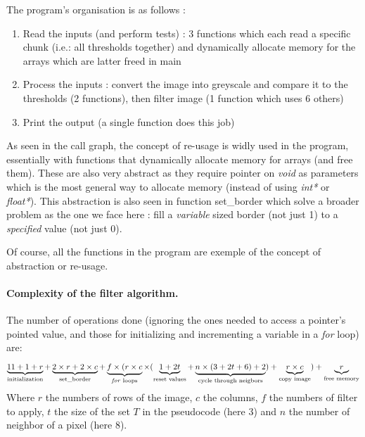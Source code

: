 \documentclass[a4paper]{report} %
\begin{document}
\SetEndCharOfAlgoLine{}

The program's organisation is as follows :
\begin{enumerate}
\item Read the inputs (and perform tests) : 3 functions which each read a specific chunk (i.e.: all thresholds together) and dynamically allocate memory for the arrays which are latter freed in main

\item Process the inputs : convert the image into greyscale and compare it to the thresholds (2 functions), then filter image (1 function which uses 6 others)

\item Print the output (a single function does this job)
\end{enumerate}

As seen in the call graph, the concept of re-usage is widly used in the program, essentially with functions that dynamically allocate memory for arrays (and free them).
These are also very abstract as they require pointer on \emph{void} as parameters which is the most general way to allocate memory (instead of using \emph{int*} or \emph{float*}).
This abstraction is also seen in function set\_border which solve a broader problem as the one we face here : fill a \emph{variable} sized border (not just 1) to a \emph{specified} value (not just 0).

Of course, all the functions in the program are exemple of the concept of abstraction or re-usage.

\paragraph{Complexity of the filter algorithm.} The number of operations done (ignoring the ones needed to access a pointer's pointed value, and those for initializing and incrementing a variable in a \emph{for} loop) are:
\[
\underbrace{11 + 1 + r }_{\text{initialization}}
+
\underbrace{2 \times r + 2 \times c }_{\text{set\_border}} 
+
\underbrace{ f \times ( r \times c }_{\text{\emph{for} loops}}
\times ( 
\underbrace{1+2t}_{\text{reset values}}
+ 
\underbrace{n \times (3 + 2t + 6) + 2}_{\text{cycle through neigbors}}
) + 
\underbrace{ r \times c }_{\text{copy image}}
)+ 
\underbrace{ r }_{\text{free memory}}
\]
Where $r$ the numbers of rows of the image, $c$ the columns, $f$ the numbers of filter to apply, $t$ the size of the set $T$ in the pseudocode (here $3$) and $n$ the number of neighbor of a pixel (here $8$).
\end{document}
